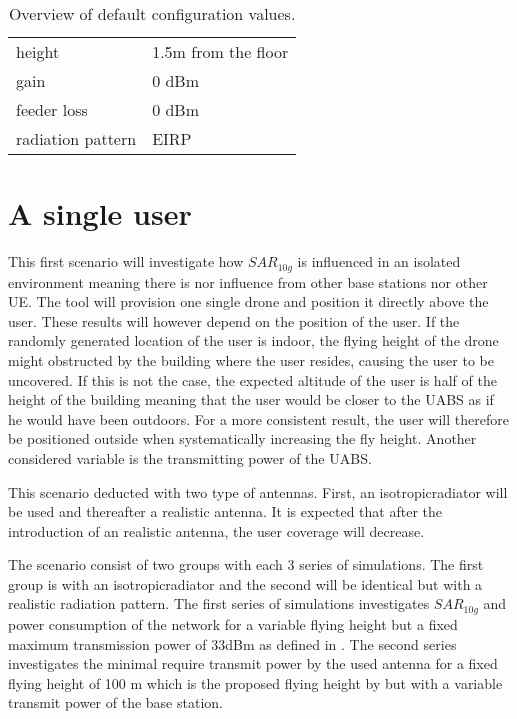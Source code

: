 \begin{table}[!htb]
\begin{tabular}[t]{ll}
        \hspace{3mm} height                     & 1.5m from the floor       \\ 
        \hspace{3mm}  gain                      & 0 dBm   \\ 
        \hspace{3mm}  feeder loss               & 0 dBm   \\ 
        \hspace{3mm}  radiation pattern         & \gls{EIRP}  \\
        \toprule
\end{tabular}
\caption{Overview of default configuration values.}
\label{table:defaultconf}
\end{table}

\section{A single user}
\label{sec:s1}

This first scenario will investigate how $SAR_{10g}$ is influenced in an isolated environment meaning there is nor influence 
from other base stations nor other \gls{UE}. The tool will provision one single drone and position it directly above the user.
These results will however depend on the position of the user. If the randomly generated location of the user is indoor, 
the flying height of the drone might obstructed by the building where the user resides, causing the user to be uncovered. If this is not the case,
the expected altitude of the user is half of the height of the building meaning that the user would be closer to the \gls{UABS} as 
if he would have been outdoors. For a more consistent result, the user will therefore be positioned outside when systematically 
increasing the fly height. Another considered variable is the transmitting power of the \gls{UABS}.

This scenario deducted with two type of antennas. First, an \gls{isotropicradiator} will be used and thereafter a realistic antenna.
It is expected that after the introduction of an realistic antenna, the user coverage will decrease.

The scenario consist of two groups with each 3 series of simulations. The first group is with an \gls{isotropicradiator} and the second 
will be identical but with a realistic radiation pattern. The first series of simulations
investigates $SAR_{10g}$ and power consumption of the network for a variable flying height but a fixed maximum transmission power of 
33dBm as defined in \cite{J2}. The second series 
investigates the minimal require transmit power by the used antenna for a fixed flying height of 100 m 
which is the proposed flying height by \cite{J2} but with a variable transmit power of the base station.

